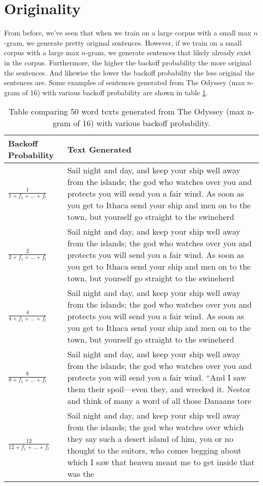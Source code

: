 \documentclass[11pt]{article}
\begin{document}
\section{Originality}
From before, we've seen that when we train on a large corpus with a small max $n$-gram, we generate pretty original sentences. However, if we train on a small corpus with a large max $n$-gram, we generate sentences that likely already exist in the corpus. Furthermore, the higher the backoff probability the more original the sentences. And likewise the lower the backoff probability the less original the sentences are. Some examples of sentences generated from The Odyssey (max $n$-gram of 16) with various backoff probability are shown in table \ref{table:orig}. 
\begin{table}[H]
\centering
\begin{tabular}{|p{1in}|p{5.5in}|}
\hline
Backoff Probability & Text Generated\\ \hline
$\frac{1}{1+f_1+...+f_l}$ & Sail night and day, and keep your ship well away from the islands; the god who watches over you and protects you will send you a fair wind. As soon as you get to Ithaca send your ship and men on to the town, but yourself go straight to the swineherd\\ \hline
$\frac{2}{2+f_1+...+f_l}$ & Sail night and day, and keep your ship well away from the islands; the god who watches over you and protects you will send you a fair wind. As soon as you get to Ithaca send your ship and men on to the town, but yourself go straight to the swineherd\\ \hline
$\frac{4}{4+f_1+...+f_l}$ & Sail night and day, and keep your ship well away from the islands; the god who watches over you and protects you will send you a fair wind. As soon as you get to Ithaca send your ship and men on to the town, but yourself go straight to the swineherd\\ \hline
$\frac{8}{8+f_1+...+f_l}$ & Sail night and day, and keep your ship well away from the islands; the god who watches over you and protects you will send you a fair wind.  “And I saw them their spoil—even they, and wrecked it. Nestor and think of many a word of all those Danaans tore\\ \hline
$\frac{12}{12+f_1+...+f_l}$ & Sail night and day, and keep your ship well away from the islands; the god who watches over which they say such a desert island of him, you or no thought to the suitors, who comes begging about which I saw that heaven meant me to get inside that was the\\ \hline
\end{tabular}
\caption{\label{table:orig} Table comparing 50 word texts generated from The Odyssey (max n-gram of 16) with various backoff probability.}
\end{table}
\end{document}
